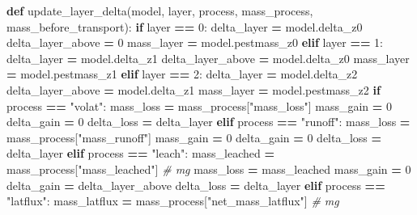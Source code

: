 \documentclass[]{article}
\newenvironment{Shaded}{\begin{snugshade}}{\end{snugshade}}
\newcommand{\KeywordTok}[1]{\textcolor[rgb]{0.13,0.29,0.53}{\textbf{#1}}}
\newcommand{\DecValTok}[1]{\textcolor[rgb]{0.00,0.00,0.81}{#1}}
\newcommand{\StringTok}[1]{\textcolor[rgb]{0.31,0.60,0.02}{#1}}
\newcommand{\CommentTok}[1]{\textcolor[rgb]{0.56,0.35,0.01}{\textit{#1}}}
\newcommand{\ControlFlowTok}[1]{\textcolor[rgb]{0.13,0.29,0.53}{\textbf{#1}}}
\newcommand{\OperatorTok}[1]{\textcolor[rgb]{0.81,0.36,0.00}{\textbf{#1}}}
\newcommand{\NormalTok}[1]{#1}
\begin{document}
\begin{Shaded}
\begin{Highlighting}[]
\KeywordTok{def}\NormalTok{ update_layer_delta(model, layer, process, mass_process, mass_before_transport):}
    \ControlFlowTok{if}\NormalTok{ layer }\OperatorTok{==} \DecValTok{0}\NormalTok{:}
\NormalTok{      delta_layer }\OperatorTok{=}\NormalTok{ model.delta_z0}
\NormalTok{      delta_layer_above }\OperatorTok{=} \DecValTok{0}
\NormalTok{      mass_layer }\OperatorTok{=}\NormalTok{ model.pestmass_z0}
    \ControlFlowTok{elif}\NormalTok{ layer }\OperatorTok{==} \DecValTok{1}\NormalTok{:}
\NormalTok{        delta_layer }\OperatorTok{=}\NormalTok{ model.delta_z1}
\NormalTok{        delta_layer_above }\OperatorTok{=}\NormalTok{ model.delta_z0}
\NormalTok{        mass_layer }\OperatorTok{=}\NormalTok{ model.pestmass_z1}
    \ControlFlowTok{elif}\NormalTok{ layer }\OperatorTok{==} \DecValTok{2}\NormalTok{:}
\NormalTok{        delta_layer }\OperatorTok{=}\NormalTok{ model.delta_z2}
\NormalTok{        delta_layer_above }\OperatorTok{=}\NormalTok{ model.delta_z1}
\NormalTok{        mass_layer }\OperatorTok{=}\NormalTok{ model.pestmass_z2}
    \ControlFlowTok{if}\NormalTok{ process }\OperatorTok{==} \StringTok{"volat"}\NormalTok{:}
\NormalTok{        mass_loss }\OperatorTok{=}\NormalTok{ mass_process[}\StringTok{"mass_loss"}\NormalTok{]}
\NormalTok{        mass_gain }\OperatorTok{=} \DecValTok{0}
\NormalTok{        delta_gain }\OperatorTok{=} \DecValTok{0}
\NormalTok{        delta_loss }\OperatorTok{=}\NormalTok{ delta_layer}
    \ControlFlowTok{elif}\NormalTok{ process }\OperatorTok{==} \StringTok{"runoff"}\NormalTok{:}
\NormalTok{        mass_loss }\OperatorTok{=}\NormalTok{ mass_process[}\StringTok{"mass_runoff"}\NormalTok{]}
\NormalTok{        mass_gain }\OperatorTok{=} \DecValTok{0}
\NormalTok{        delta_gain }\OperatorTok{=} \DecValTok{0}
\NormalTok{        delta_loss }\OperatorTok{=}\NormalTok{ delta_layer}
    \ControlFlowTok{elif}\NormalTok{ process }\OperatorTok{==} \StringTok{"leach"}\NormalTok{:}
\NormalTok{        mass_leached }\OperatorTok{=}\NormalTok{ mass_process[}\StringTok{"mass_leached"}\NormalTok{]  }\CommentTok{# mg}
\NormalTok{        mass_loss }\OperatorTok{=}\NormalTok{ mass_leached}
\NormalTok{        mass_gain }\OperatorTok{=} \DecValTok{0}
\NormalTok{        delta_gain }\OperatorTok{=}\NormalTok{ delta_layer_above}
\NormalTok{        delta_loss }\OperatorTok{=}\NormalTok{ delta_layer}
    \ControlFlowTok{elif}\NormalTok{ process }\OperatorTok{==} \StringTok{"latflux"}\NormalTok{:}
\NormalTok{        mass_latflux }\OperatorTok{=}\NormalTok{ mass_process[}\StringTok{"net_mass_latflux"}\NormalTok{]  }\CommentTok{# mg}

\end{Highlighting}
\end{Shaded}
\end{document}
